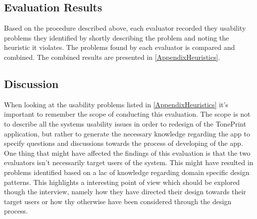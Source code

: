 \subsection{Evaluation Results}
\label{Heuristic_Results}
Based on the procedure described above, each evaluator recorded they usability problems they identified by shortly describing the problem and noting the heuristic it violates. The problems found by each evaluator is compared and combined. The combined results are presented in \autoref{AppendixHeuristics}. 

\subsection{Discussion}
\label{HeuristicDiscussion}
When looking at the usability problems listed in \autoref{AppendixHeuristics} it's important to remember the scope of conducting this evaluation. The scope is not to describe all the systems usability issues in order to redesign of the TonePrint application, but rather to generate the necessary knowledge regarding the app to specify questions and discussions towards the process of developing of the app. \\
One thing that might have affected the findings of this evaluation is that the two evaluators isn't necessarily target users of the system. This might have resulted in problems identified based on a lac of knowledge regarding domain specific design patterns. This highlights a interesting point of view which should be explored though the interview, namely how they have directed their design towards their target users or how thy otherwise have been considered through the design process. \\







